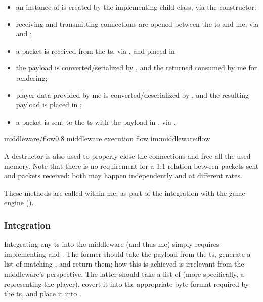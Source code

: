 \begin{itemize}
	\item an instance of  is created by the implementing child class, via the  constructor;
	\item receiving and transmitting connections are opened between the \gls{ts} and \gls{me}, via  and ;
	\item a \gls{packet} is received from the \gls{ts}, via , and placed in 
	\item the \gls{payload} is converted/serialized by , and the returned  consumed by \gls{me} for rendering;
	\item player data provided by \gls{me} is converted/deserialized by , and the resulting \gls{payload} is placed in ;
	\item a \gls{packet} is sent to the \gls{ts} with the \gls{payload} in , via .
\end{itemize}

\begin{image}
	{middleware/flow}{0.8}
	{\gls{middleware} execution flow}
	{im:middleware:flow}
	{}
\end{image}

A destructor is also used to properly close the connections and free all the used memory. Note that there is no requirement for a 1:1 relation between \glspl{packet} sent and \glspl{packet} received: both may happen independently and at different rates.

These methods are called within \gls{me}, as part of the integration with the game engine ().

\subsubsection{Integration}

Integrating any \gls{ts} into the \gls{middleware} (and thus \gls{me}) simply requires implementing  and . The former should take the \gls{payload} from the \gls{ts}, generate a list of matching , and return them; how this is achieved is irrelevant from the \gls{middleware}'s perspective. The latter should take a list of  (more specifically, a  representing the player), covert it into the appropriate byte format required by the \gls{ts}, and place it into .

